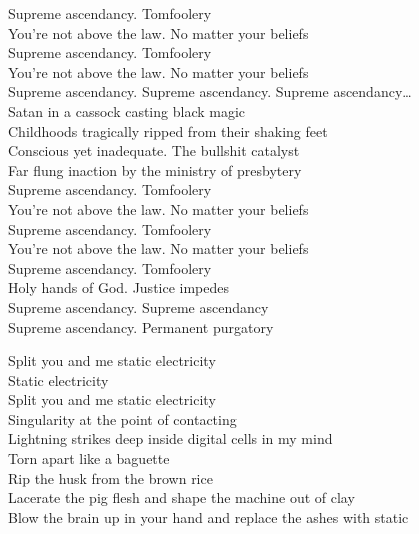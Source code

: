 Supreme ascendancy. Tomfoolery \\
You're not above the law. No matter your beliefs \\
Supreme ascendancy. Tomfoolery \\
You're not above the law. No matter your beliefs \\

Supreme ascendancy. Supreme ascendancy. Supreme ascendancy… \\

Satan in a cassock casting black magic \\
Childhoods tragically ripped from their shaking feet \\
Conscious yet inadequate. The bullshit catalyst \\
Far flung inaction by the ministry of presbytery \\

Supreme ascendancy. Tomfoolery \\
You're not above the law. No matter your beliefs \\
Supreme ascendancy. Tomfoolery \\
You're not above the law. No matter your beliefs \\
Supreme ascendancy. Tomfoolery \\
Holy hands of God. Justice impedes \\

Supreme ascendancy. Supreme ascendancy \\
Supreme ascendancy. Permanent purgatory \\




Split you and me static electricity \\
Static electricity \\
Split you and me static electricity \\

Singularity at the point of contacting \\
Lightning strikes deep inside digital cells in my mind \\
Torn apart like a baguette \\
Rip the husk from the brown rice \\
Lacerate the pig flesh and shape the machine out of clay \\
Blow the brain up in your hand and replace the ashes with static \\

